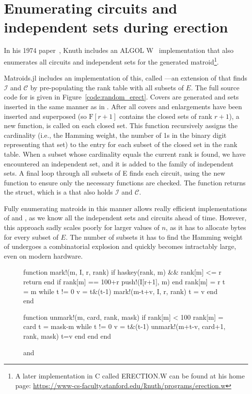 \chapter{Enumerating circuits and independent sets during erection}
In his 1974 paper~\cite{knuth-1975}, Knuth includes an ALGOL W~\cite{wirth-1966} implementation that also enumerates all circuits and independent sets for the generated matroid\footnote{A later implementation in C called ERECTION.W can be found at his home page: \href{https://www-cs-faculty.stanford.edu/\~knuth/programs/erection.w}{https://www-cs-faculty.stanford.edu/\~knuth/programs/erection.w}}. 

Matroids.jl includes an implementation of this, called ---an extension of  that finds $\mathcal{I}$ and $\mathcal{C}$ by pre-populating the rank table with all subsets of $E$. The full source code for  is given in Figure~\ref{code:random_erect}. Covers are generated and sets inserted in the same manner as in . After all covers and enlargements have been inserted and superposed (so $\mathrm{F}[r+1]$ contains the closed sets of rank $r+1$), a new function,  is called on each closed set. This function recursively assigns the cardinality (i.e., the Hamming weight, the number of 1s in the binary digit representing that set) to the entry for each subset of the closed set in the rank table. When a subset whose cardinality equals the current rank is found, we have encountered an independent set, and it is added to the family of independent sets. A final loop through all subsets of E finds each circuit, using the new  function to ensure only the necessary functions are checked. The function returns the  struct, which is a  that also holds $\mathcal{I}$ and $\mathcal{C}$.

Fully enumerating matroids in this manner allows really efficient implementations of  and , as we know all the independent sets and circuits ahead of time. However, this approach sadly scales poorly for larger values of $n$, as it has to allocate bytes for every subset of $E$. The number of subsets it has to find the Hamming weight of undergoes a combinatorial explosion and quickly becomes intractably large, even on modern hardware.

\begin{figure}
  \begin{jllisting}
function mark!(m, I, r, rank)
  if haskey(rank, m) && rank[m] <= r
    return
  end
  if rank[m] == 100+r push!(I[r+1], m) end
  rank[m] = r
  t = m
  while t != 0
    v = t&(t-1)
    mark!(m-t+v, I, r, rank)
    t = v
  end
end

function unmark!(m, card, rank, mask)
  if rank[m] < 100
    rank[m] = card
    t = mask-m
    while t != 0
      v = t&(t-1)
      unmark!(m+t-v, card+1, rank, mask)
      t=v
    end
  end
end
  \end{jllisting}
  \caption{ and }
\end{figure}

